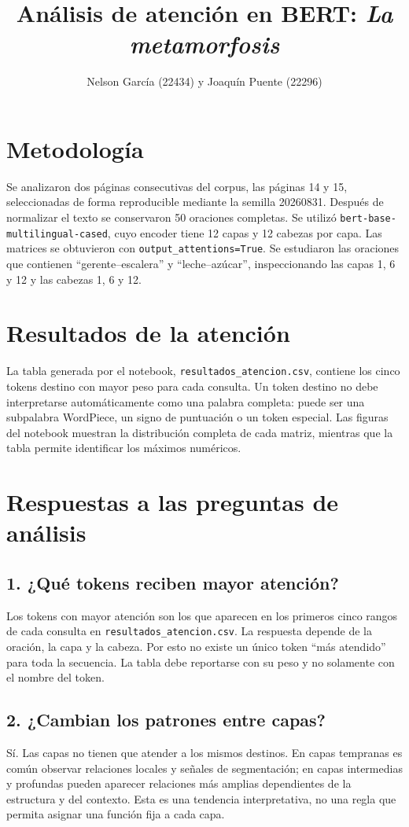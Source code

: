 \documentclass[12pt,a4paper]{article}
\title{Análisis de atención en BERT: \textit{La metamorfosis}}
\author{Nelson García (22434) y Joaquín Puente (22296)}
\date{}
\begin{document}
\maketitle

\section{Metodología}
Se analizaron dos páginas consecutivas del corpus, las páginas 14 y 15, seleccionadas de forma reproducible mediante la semilla 20260831. Después de normalizar el texto se conservaron 50 oraciones completas. Se utilizó \texttt{bert-base-multilingual-cased}, cuyo encoder tiene 12 capas y 12 cabezas por capa. Las matrices se obtuvieron con \texttt{output\_attentions=True}. Se estudiaron las oraciones que contienen ``gerente--escalera'' y ``leche--azúcar'', inspeccionando las capas 1, 6 y 12 y las cabezas 1, 6 y 12.

\section{Resultados de la atención}
La tabla generada por el notebook, \texttt{resultados\_atencion.csv}, contiene los cinco tokens destino con mayor peso para cada consulta. Un token destino no debe interpretarse automáticamente como una palabra completa: puede ser una subpalabra WordPiece, un signo de puntuación o un token especial. Las figuras del notebook muestran la distribución completa de cada matriz, mientras que la tabla permite identificar los máximos numéricos.

\section{Respuestas a las preguntas de análisis}
\subsection{1. ¿Qué tokens reciben mayor atención?}
Los tokens con mayor atención son los que aparecen en los primeros cinco rangos de cada consulta en \texttt{resultados\_atencion.csv}. La respuesta depende de la oración, la capa y la cabeza. Por esto no existe un único token ``más atendido'' para toda la secuencia. La tabla debe reportarse con su peso y no solamente con el nombre del token.

\subsection{2. ¿Cambian los patrones entre capas?}
Sí. Las capas no tienen que atender a los mismos destinos. En capas tempranas es común observar relaciones locales y señales de segmentación; en capas intermedias y profundas pueden aparecer relaciones más amplias dependientes de la estructura y del contexto. Esta es una tendencia interpretativa, no una regla que permita asignar una función fija a cada capa.
\end{document}
